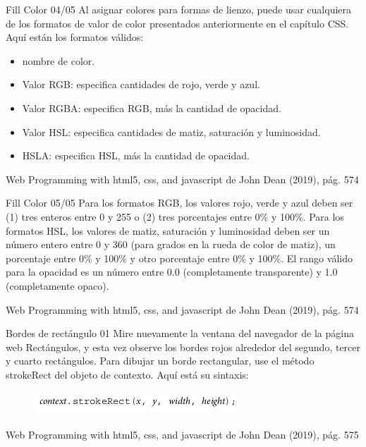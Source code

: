 \begin{frame}{Fill Color 04/05}
\justifying
Al asignar colores para formas de lienzo, puede usar cualquiera de los formatos de valor de color presentados anteriormente en el capítulo CSS. Aquí están los formatos válidos:

\begin{itemize}
\item nombre de color.
\item Valor RGB: especifica cantidades de rojo, verde y azul.
\item Valor RGBA: especifica RGB, más la cantidad de opacidad.
\item Valor HSL: especifica cantidades de matiz, saturación y luminosidad.
\item HSLA: especifica HSL, más la cantidad de opacidad.
\end{itemize}

{\tiny Web Programming with html5, css, and javascript de John Dean (2019), pág. 574}
\end{frame}

\begin{frame}{Fill Color 05/05}
\justifying
Para los formatos RGB, los valores rojo, verde y azul deben ser (1) tres enteros entre 0 y 255 o (2) tres porcentajes entre 0\% y 100\%. Para los formatos HSL, los valores de matiz, saturación y luminosidad deben ser un número entero entre 0 y 360 (para grados en la rueda de color de matiz), un porcentaje entre 0\% y 100\% y otro porcentaje entre 0\% y 100\%. El rango válido para la opacidad es un número entre 0.0 (completamente transparente) y 1.0 (completamente opaco).


{\tiny Web Programming with html5, css, and javascript de John Dean (2019), pág. 574}
\end{frame}

\begin{frame}{Bordes de rectángulo 01}
\justifying
Mire nuevamente la ventana del navegador de la página web Rectángulos, y esta vez observe los bordes rojos alrededor del segundo, tercer y cuarto rectángulos. Para dibujar un borde rectangular, use el método strokeRect del objeto de contexto. Aquí está su sintaxis:

\begin{figure}[H]
\centering
\includegraphics[scale=0.4]{Section_Files/images/Sec02/11.png}
\end{figure}

{\tiny Web Programming with html5, css, and javascript de John Dean (2019), pág. 575}
\end{frame}

